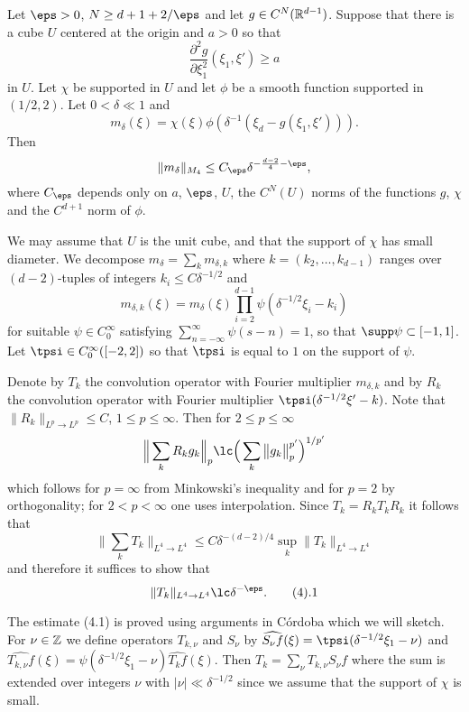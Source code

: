 Let $\eps>0$, $N\ge d+1+2/\eps$ and let $g \in C^{N}(\Bbb R^{d-1})$.
Suppose  that there is a cube $U$ centered at the origin 
and $a>0$ 
so that 
$$\frac{\partial^2 g}{\partial \xi_1^2}(\xi_1,\xi')\ge a$$ 
in $U$. Let $\chi$ be supported in $U$ and 
let $\phi$ be a smooth function supported in $(1/2,2)$.
Let $0<\delta\ll 1$
and
$$m_\delta(\xi)=\chi(\xi) \phi(\delta^{-1}(\xi_d-g(\xi_1,\xi'))).$$
Then 
 $$\|m_\delta\|_{M_4}\le C_\eps \delta^{-\frac {d-2}4-\eps},$$
where $C_\eps$ depends only on $a$, $\eps$, $U$, the 
$C^{N}(U)$ norms of the functions $g$, $\chi$  and the $C^{d+1}$ norm of 
$\phi$.
\endproclaim






 We may assume that $U$ is the unit cube, and that the support of $\chi$ 
has small diameter.
We decompose
$m_{\delta}=\sum_k m_{\delta,k}$ where $k=(k_2,\dots, k_{d-1})$ ranges over 
$(d-2)$-tuples of integers $k_i\le C\delta^{-1/2}$ and 
$$m_{\delta,k}(\xi)=
m_\delta(\xi)\prod_{i=2}^{d-1}\psi(\delta^{-1/2}\xi_i-k_i ) 
$$
for suitable $\psi\in C^\infty_0$ satisfying 
$\sum_{n=-\infty}^\infty\psi(s-n)=1$, so that $\supp \psi\subset [-1,1]$.
Let $\tpsi\in C^\infty_0([-2,2])$  so that $\tpsi$ is 
equal to $1$ on the support
of $\psi$.

Denote by $T_k$ the convolution operator with 
Fourier multiplier  $m_{\delta,k}$ and by 
$R_k$ the convolution operator 
with 
 Fourier multiplier  $\tpsi(\delta^{-1/2}\xi'-k)$.
Note that
$\|R_k\|_{L^p\to L^p}\le C$, $1\le p\le \infty$.
Then for $2\le p\le \infty$
$$\Big\|\sum_k R_k g_k\Big\|_p
\lc \Big(\sum_k\big\|g_k\big\|_p^{p'}\Big)^{1/p'}$$
which follows for  $p=\infty$ from Minkowski's inequality and for $p=2$
by orthogonality; for $2<p<\infty$ one uses interpolation.
Since $T_k=R_kT_kR_k$ it follows that
$$
\Big\|\sum_k T_k\Big\|_{L^4\to L^4}
\le C\delta^{-(d-2)/4} \sup_k\|T_k\|_{L^4\to L^4}
$$
and therefore it suffices to show that 
$$\|T_k\|_{L^4\to L^4}\lc \delta^{-\eps}.
\tag 4.1
$$

The estimate (4.1)  is proved using  arguments in C\'ordoba \cite{6}
 which we  will sketch.
For $\nu\in \Bbb Z$ we define
operators $T_{k,\nu}$ and $S_\nu$ by 
$\widehat {S_\nu f}(\xi)=\tpsi(\delta^{-1/2}\xi_1-\nu)$ and
$\widehat {T_{k,\nu} f}(\xi)=\psi(\delta^{-1/2}\xi_1-\nu)\widehat{T_k f}(\xi)$.
Then
$T_k=\sum_\nu T_{k,\nu}S_\nu f$ where the sum is extended over integers $\nu$ 
with $|\nu|\ll \delta^{-1/2}$ since we assume that
 the support of $\chi$  is small.


